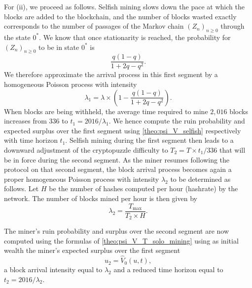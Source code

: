 \noindent For (ii), we proceed as follows. Selfish mining slows down the pace at which the blocks are added to the blockchain, and the number of blocks wasted exactly corresponds to the number of passages of the Markov chain $(Z_n)_{n\geq0}$ through the state $0^\ast$. We know that once stationarity is reached, the probability for  $(Z_n)_{n\geq0}$ to be in state $0^\ast$ is 
$$
\frac{q(1-q)}{1+2q-q^2}.
$$
We therefore approximate the arrival process in this first segment by a homogeneous Poisson process with intensity 
 $$
\lambda_1 = \lambda \times\left(1- \frac{q(1-q)}{ 1+2q-q^2}\right).
$$ 
When blocks are being withheld, the average time required to mine $2,016$ blocks increases from $336$ to $t_1 = 2016/\lambda_1$. We hence compute the ruin probability and expected surplus over the first segment using \cref{theo:psi_V_selfish} respectively with time horizon $t_1$. Selfish mining during the first segment then leads to a downward adjustment of the cryptopuzzle difficulty  to $T_2 = T\times{t_1}/{336}$ that will be in force during the second segment. As the miner resumes following the protocol on that second segment, the block arrival process becomes again a proper homogeneous Poisson process with intensity $\lambda_2$ to be determined as follows. Let $H$ be the number of hashes computed per hour (hashrate) by the network. The number of blocks mined per hour is then given by 
$$
\lambda_2 = \frac{T_{\max}}{T_2\times H}.
$$

The miner's ruin probability and surplus over the second segment are now computed using the formulas of \cref{theo:psi_V_T_solo_mining} using as initial wealth the miner's expected surplus over the first segment
\[
u_2 = \widehat{V}_0(u,t), 
\]
a block arrival intensity equal to $\lambda_2$ and a reduced time horizon equal to $t_2=2016/\lambda_2$.\\  

